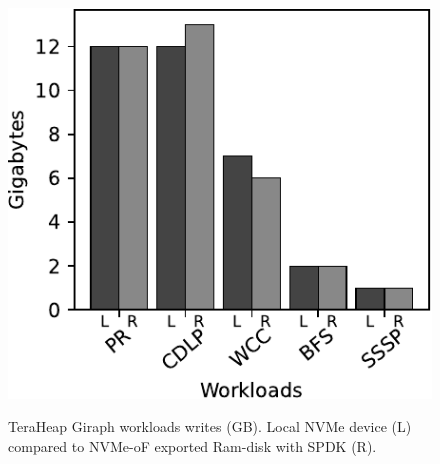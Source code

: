 \begin{figure}[H]
  \includegraphics[width=\linewidth]{figures/ram_gir_w.pdf}\\
\caption{TeraHeap Giraph workloads writes (GB). Local NVMe device (L) compared to NVMe-oF exported Ram-disk with SPDK (R).}
\label{fig:ram_gir_w}
\end{figure}
